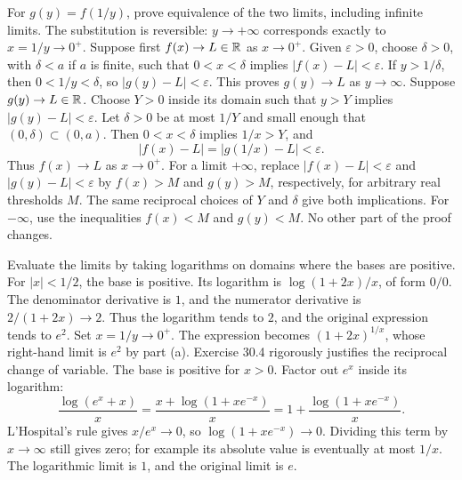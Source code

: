 \goal For $g(y)=f(1/y)$, prove equivalence of the two limits, including infinite limits.
\idea The substitution is reversible: $y\to+\infty$ corresponds exactly to $x=1/y\to0^+$.
Suppose first $f(x)\to L\in\mathbb{R}$ as $x\to0^+$. Given $\varepsilon>0$, choose $\delta>0$, with $\delta<a$ if $a$ is finite, such that $0<x<\delta$ implies $|f(x)-L|<\varepsilon$. If $y>1/\delta$, then $0<1/y<\delta$, so $|g(y)-L|<\varepsilon$. This proves $g(y)\to L$ as $y\to\infty$.
Suppose $g(y)\to L\in\mathbb{R}$. Choose $Y>0$ inside its domain such that $y>Y$ implies $|g(y)-L|<\varepsilon$. Let $\delta>0$ be at most $1/Y$ and small enough that $(0,\delta)\subset(0,a)$. Then $0<x<\delta$ implies $1/x>Y$, and
\[
 |f(x)-L|=|g(1/x)-L|<\varepsilon.
\]
Thus $f(x)\to L$ as $x\to0^+$.
For a limit $+\infty$, replace $|f(x)-L|<\varepsilon$ and $|g(y)-L|<\varepsilon$ by $f(x)>M$ and $g(y)>M$, respectively, for arbitrary real thresholds $M$. The same reciprocal choices of $Y$ and $\delta$ give both implications. For $-\infty$, use the inequalities $f(x)<M$ and $g(y)<M$. No other part of the proof changes.

\goal Evaluate the limits by taking logarithms on domains where the bases are positive.
For $|x|<1/2$, the base is positive. Its logarithm is $\log(1+2x)/x$, of form $0/0$. The denominator derivative is $1$, and the numerator derivative is $2/(1+2x)\to2$. Thus the logarithm tends to $2$, and the original expression tends to $e^2$.
Set $x=1/y\to0^+$. The expression becomes $(1+2x)^{1/x}$, whose right-hand limit is $e^2$ by part (a). Exercise 30.4 rigorously justifies the reciprocal change of variable.
The base is positive for $x>0$. Factor out $e^x$ inside its logarithm:
\[
 \frac{\log(e^x+x)}x
 =\frac{x+\log(1+xe^{-x})}x
 =1+\frac{\log(1+xe^{-x})}x.
\]
L'Hospital's rule gives $x/e^x\to0$, so $\log(1+xe^{-x})\to0$. Dividing this term by $x\to\infty$ still gives zero; for example its absolute value is eventually at most $1/x$. The logarithmic limit is $1$, and the original limit is $e$.

